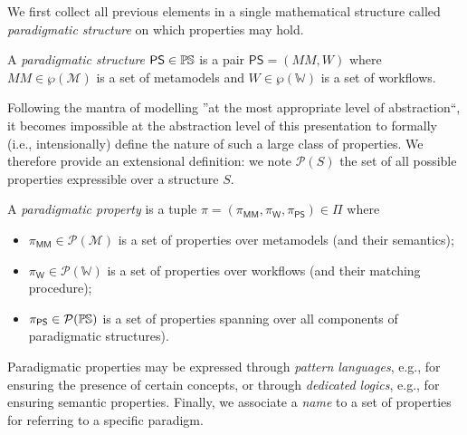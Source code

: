 We first collect all previous elements in a single mathematical structure 
called \emph{paradigmatic structure} on which properties may hold.


\begin{Definition}
   A \emph{paradigmatic structure} $\mathsf{PS}\in \mathbb{P}\mskip-1mu\mathbb{S}$ is a pair $\mathsf{PS} 
= (MM, W)$ where $MM\in \wp(\mathcal{M})$ is a set of metamodels and 
$W \in \wp(\mathbb{W})$ is a set of workflows.
\end{Definition}


Following the mantra of modelling ''at the most appropriate 
level of abstraction``, it becomes impossible at the abstraction level of this 
presentation to formally (i.e., intensionally) define the nature of such a 
large class of properties. We therefore provide an extensional definition: we 
note $\mathcal{P}(S)$ the set of all possible properties expressible over a 
structure $S$. 


\begin{Definition}
   A \emph{paradigmatic property} is a tuple
$\pi = (\pi_{\mathsf{MM}},\pi_{\mathsf{W}},\pi_{\mathsf{PS}}) \in \Pi$ where
\begin{itemize}
   \item $\pi_{\mathsf{MM}} \in \mathcal{P}(\mathcal{M})$ is a set of 
properties 
over metamodels (and their semantics);
   \item $\pi_{\mathsf{W}} \in \mathcal{P}(\mathbb{W})$ is a set of properties 
over workflows (and their matching procedure);
   \item $\pi_{\mathsf{PS}}\in\mathcal{P}(\mathbb{P}\mskip-1mu\mathbb{S})$ is a set of 
properties spanning over all components of paradigmatic structures).
\end{itemize}
\end{Definition}
\noindent
Paradigmatic properties may be expressed through \emph{pattern languages}, 
e.g., for ensuring the presence of certain concepts, or through \emph{dedicated 
logics}, e.g., for ensuring semantic properties. 
Finally, we associate a \emph{name} to a set of properties for referring to a 
specific paradigm.

